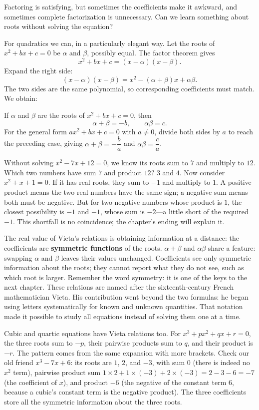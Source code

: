 Factoring is satisfying, but sometimes the coefficients make it awkward, and sometimes complete factorization is unnecessary. Can we learn something about roots without solving the equation?

For quadratics we can, in a particularly elegant way. Let the roots of $x^2+bx+c=0$ be $\alpha$ and $\beta$, possibly equal. The factor theorem gives
\[
x^2+bx+c = (x-\alpha)(x-\beta).
\]
Expand the right side:
\[
(x-\alpha)(x-\beta) = x^2 - (\alpha+\beta)x + \alpha\beta.
\]
The two sides are the same polynomial, so corresponding coefficients must match. We obtain:

\begin{dingli}
If $\alpha$ and $\beta$ are the roots of $x^2+bx+c=0$, then
\[
\alpha+\beta = -b, \qquad \alpha\beta = c.
\]
For the general form $ax^2+bx+c=0$ with $a\neq 0$, divide both sides by $a$ to reach the preceding case, giving $\alpha+\beta=-\dfrac{b}{a}$ and $\alpha\beta=\dfrac{c}{a}$.
\end{dingli}

\begin{li}
Without solving $x^2-7x+12=0$, we know its roots sum to $7$ and multiply to $12$. Which two numbers have sum $7$ and product $12$? $3$ and $4$. Now consider $x^2+x+1=0$. If it has real roots, they sum to $-1$ and multiply to $1$. A positive product means the two real numbers have the same sign; a negative sum means both must be negative. But for two negative numbers whose product is $1$, the closest possibility is $-1$ and $-1$, whose sum is $-2$---a little short of the required $-1$. This shortfall is no coincidence; the chapter's ending will explain it.
\end{li}

The real value of Vieta's relations is obtaining information at a distance: the coefficients are \textbf{symmetric functions} of the roots. $\alpha+\beta$ and $\alpha\beta$ share a feature: swapping $\alpha$ and $\beta$ leaves their values unchanged. Coefficients see only symmetric information about the roots; they cannot report what they do not see, such as which root is larger. Remember the word symmetry: it is one of the keys to the next chapter. These relations are named after the sixteenth-century French mathematician Vieta. His contribution went beyond the two formulas: he began using letters systematically for known and unknown quantities. That notation made it possible to study all equations instead of solving them one at a time.

Cubic and quartic equations have Vieta relations too. For $x^3+px^2+qx+r=0$, the three roots sum to $-p$, their pairwise products sum to $q$, and their product is $-r$. The pattern comes from the same expansion with more brackets. Check our old friend $x^3-7x+6$: its roots are $1$, $2$, and $-3$, with sum $0$ (there is indeed no $x^2$ term), pairwise product sum $1\times 2+1\times(-3)+2\times(-3)=2-3-6=-7$ (the coefficient of $x$), and product $-6$ (the negative of the constant term $6$, because a cubic's constant term is the negative product). The three coefficients store all the symmetric information about the three roots.

